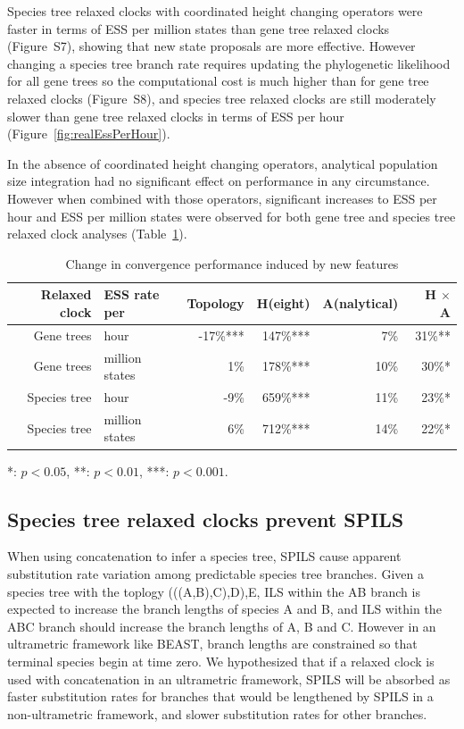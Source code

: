 \documentclass[nogrid]{MBE}%
\begin{document}
Species tree relaxed clocks with coordinated height changing operators were
faster in terms of ESS per million states than gene tree relaxed clocks
(Figure~S7), showing that new state proposals are more effective. However
changing a species tree branch rate requires updating the phylogenetic
likelihood for all gene trees so the computational cost is much higher than for
gene tree relaxed clocks (Figure~S8), and species tree relaxed clocks are still
moderately slower than gene tree relaxed clocks in terms of ESS per hour
(Figure~\ref{fig:realEssPerHour}).

In the absence of coordinated height changing operators, analytical population
size integration had no significant effect on performance in any
circumstance. However when combined with those operators, significant increases
to ESS per hour and ESS per million states were observed for both gene tree and
species tree relaxed clock analyses (Table~\ref{tab:convergenceLM}).

\begin{table}[htb!]
\caption{Change in convergence performance induced by new features}
\label{tab:convergenceLM}
\begin{threeparttable}
\begin{tabular*}{\textwidth}{@{\extracolsep{\fill}}rlrrrr@{}}
\hline
Relaxed clock & ESS rate per & Topology & H(eight) & A(nalytical) & H $\times$ A\tabularnewline
\hline
Gene trees & hour & -17\%{***} & 147\%{***} & 7\%\hphantom{***} & 31\%{**}\hphantom{*}\tabularnewline
Gene trees & million states & 1\%\hphantom{***} & 178\%{***} & 10\%\hphantom{***} & 30\%{*}\hphantom{**}\tabularnewline
Species tree & hour & -9\%\hphantom{***} & 659\%{***} & 11\%\hphantom{***} & 23\%{*}\hphantom{**}\tabularnewline
Species tree & million states & 6\%\hphantom{***} & 712\%{***} & 14\%\hphantom{***} & 22\%{*}\hphantom{**}\tabularnewline
\hline
\end{tabular*}
\begin{tablenotes}
\item {*}: $p < 0.05$, {**}: $p < 0.01$, {***}: $p < 0.001$.
\end{tablenotes}
\end{threeparttable}
\end{table}

\subsection{Species tree relaxed clocks prevent SPILS}

When using concatenation to infer a species tree, SPILS cause apparent
substitution rate variation among predictable species tree branches. Given a
species tree with the toplogy (((A,B),C),D),E, ILS within the AB branch is
expected to increase the branch lengths of species A and B, and ILS within the
ABC branch should increase the branch lengths of A, B and C. However in an
ultrametric framework like BEAST, branch lengths are constrained so that
terminal species begin at time zero. We hypothesized that if a relaxed clock is
used with concatenation in an ultrametric framework, SPILS will be absorbed as
faster substitution rates for branches that would be lengthened by SPILS in a
non-ultrametric framework, and slower substitution rates for other branches.
\end{document}
